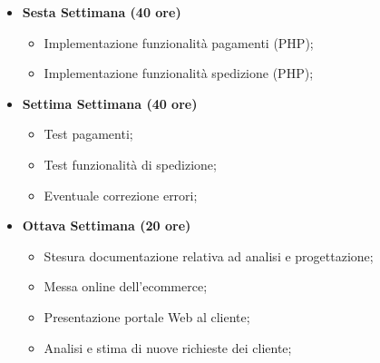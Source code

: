 {\begin{itemize}
\begin{itemize}
            \item Integrazione componenti aggiuntivi (PHP);
        \end{itemize}
        \item \textbf{Sesta Settimana (40 ore)} 
        \begin{itemize}
            \item Implementazione funzionalità pagamenti (PHP);
            \item Implementazione funzionalità spedizione (PHP);
        \end{itemize}
        \item \textbf{Settima Settimana (40 ore)} 
        \begin{itemize}
            \item Test pagamenti;
            \item Test funzionalità di spedizione;
            \item Eventuale correzione errori;
        \end{itemize}
        \item \textbf{Ottava Settimana (20 ore)} 
        \begin{itemize}
            \item Stesura documentazione relativa ad analisi e progettazione;
            \item Messa online dell'ecommerce;
            \item Presentazione portale Web al cliente;
            \item Analisi e stima di nuove richieste dei cliente;
        \end{itemize}
    \end{itemize}
}

\newcommand{\totaleOre}{304}

\newcommand{\obiettiviObbligatori}{
	\item \underline{\textit{O01}}: Realizzazione software;
	\item \underline{\textit{O02}}: Realizzazione front-end (HTML e CSS);
	\item \underline{\textit{O03}}: Realizzazione back-end (PHP);
	\item \underline{\textit{O04}}: Messa online del sito;
}

\newcommand{\obiettiviDesiderabili}{
	\item \underline{\textit{D01}}: analisi e stima nuove richieste clienti;
	\item \underline{\textit{D02}}: progettazioni eventuali nuove funzionalità;
}

\newcommand{\obiettiviFacoltativi}{
	\item \underline{\textit{F03}}: implementazione di ulteriori metodi di pagamento;
}